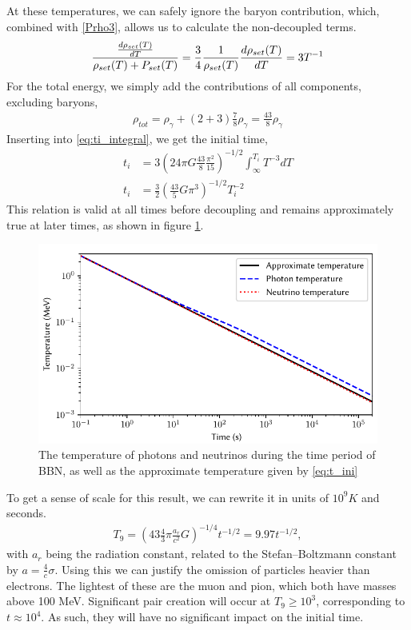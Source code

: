 At these temperatures, we can safely ignore the baryon contribution, which, combined with \eqref{Prho3}, allows us to calculate the non-decoupled terms.
\begin{align}
    \frac{\frac{d\rho_{set}(T)}{dT}}{\rho_{set}(T) + P_{set}(T)}=\frac{3}{4}\frac{1}{\rho_{set}(T)}\frac{d\rho_{set}(T)}{dT}=3T^{-1}
\end{align}
For the total energy, we simply add the contributions of all components, excluding baryons,
\begin{align}
    \rho_{tot}=\rho_\gamma+(2+3)\frac{7}{8}\rho_\gamma=\frac{43}{8}\rho_\gamma
\end{align}
Inserting into \eqref{eq:ti_integral}, we get the initial time,
\begin{align}
    t_i&=3(24\pi G\frac{43}{8}\frac{\pi^2}{15})^{-1/2}\int_{\infty}^{T_i}T^{-3}dT\\
    t_i&=\frac{3}{2}( \frac{43}{5}G\pi^3)^{-1/2}T_i^{-2}
    \label{eq:t_ini}
\end{align}
This relation is valid at all times before decoupling and remains approximately true at later times, as shown in figure \ref{fig:Temperature}.
\begin{figure}[ht]
    \includegraphics[width=5.1in]{figures/Temperature.pdf}
    \caption{The temperature of photons and neutrinos during the time period of BBN, as well as the approximate temperature given by \eqref{eq:t_ini}}
    \label{fig:Temperature}
\end{figure}

To get a sense of scale for this result, we can rewrite it in units of $10^9K$ and seconds.
\begin{align}
    T_9=( 43 \frac{4}{3}\pi\frac{a_r}{c^2}G)^{-1/4}t^{-1/2}=9.97t^{-1/2},
    \label{eq:T9_ini}
\end{align}
with $a_r$ being the radiation constant, related to the Stefan–Boltzmann constant by $a=\frac{4}{c}\sigma$. 
Using this we can justify the omission of particles heavier than electrons. The lightest of these are the muon and pion, which both have masses above 100 MeV. Significant pair creation will occur at $T_9 \geq 10^3$, corresponding to $t\approx10^4$. As such, they will have no significant impact on the initial time. 

